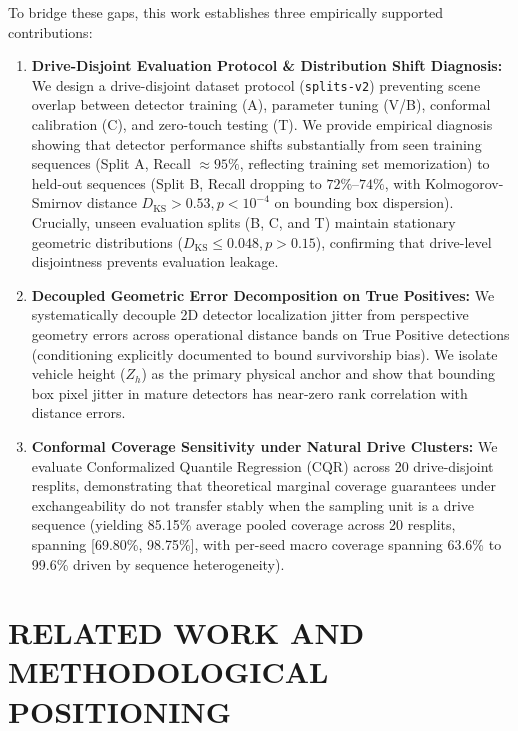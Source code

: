 \documentclass[]{spie}  %
\begin{document}
To bridge these gaps, this work establishes three empirically supported contributions:
\begin{enumerate}
    \item \textbf{Drive-Disjoint Evaluation Protocol \& Distribution Shift Diagnosis:} We design a drive-disjoint dataset protocol (\texttt{splits-v2}) preventing scene overlap between detector training (A), parameter tuning (V/B), conformal calibration (C), and zero-touch testing (T). We provide empirical diagnosis showing that detector performance shifts substantially from seen training sequences (Split A, Recall $\approx 95\%$, reflecting training set memorization) to held-out sequences (Split B, Recall dropping to $72\%\text{--}74\%$, with Kolmogorov-Smirnov distance $D_{\text{KS}} > 0.53, p < 10^{-4}$ on bounding box dispersion). Crucially, unseen evaluation splits (B, C, and T) maintain stationary geometric distributions ($D_{\text{KS}} \le 0.048, p > 0.15$), confirming that drive-level disjointness prevents evaluation leakage.
    \item \textbf{Decoupled Geometric Error Decomposition on True Positives:} We systematically decouple 2D detector localization jitter from perspective geometry errors across operational distance bands on True Positive detections (conditioning explicitly documented to bound survivorship bias). We isolate vehicle height ($Z_h$) as the primary physical anchor and show that bounding box pixel jitter in mature detectors has near-zero rank correlation with distance errors.
    \item \textbf{Conformal Coverage Sensitivity under Natural Drive Clusters:} We evaluate Conformalized Quantile Regression (CQR) across 20 drive-disjoint resplits, demonstrating that theoretical marginal coverage guarantees under exchangeability do not transfer stably when the sampling unit is a drive sequence (yielding 85.15\% average pooled coverage across 20 resplits, spanning [69.80\%, 98.75\%], with per-seed macro coverage spanning 63.6\% to 99.6\% driven by sequence heterogeneity).
\end{enumerate}

\section{RELATED WORK AND METHODOLOGICAL POSITIONING}
\label{sec:related_work}
\end{document}
